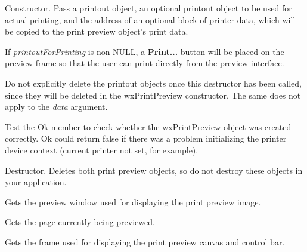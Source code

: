 

\label{wxprintpreviewctor}


Constructor. Pass a printout object, an optional printout object to be
used for actual printing, and the address of an optional
block of printer data, which will be copied to the print preview object's
print data.

If {\it printoutForPrinting} is non-NULL, a {\bf Print...} button will be placed on the
preview frame so that the user can print directly from the preview interface.

Do not explicitly delete the printout objects once this destructor has been
called, since they will be deleted in the wxPrintPreview constructor.
The same does not apply to the {\it data} argument.

Test the Ok member to check whether the wxPrintPreview object was created correctly.
Ok could return false if there was a problem initializing the printer device context
(current printer not set, for example).


\label{wxprintpreviewdtor}


Destructor. Deletes both print preview objects, so do not destroy these objects
in your application.


\label{wxprintpreviewgetcanvas}


Gets the preview window used for displaying the print preview image.


\label{wxprintpreviewgetcurrentpage}


Gets the page currently being previewed.


\label{wxprintpreviewgetframe}


Gets the frame used for displaying the print preview canvas
and control bar.


\label{wxprintpreviewgetmaxpage}

